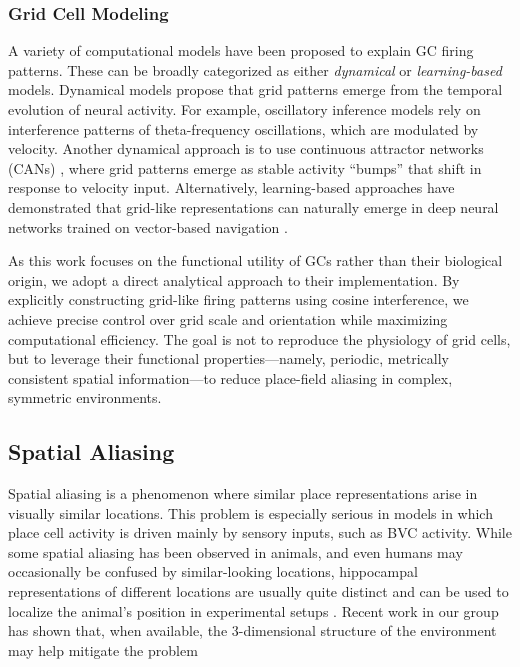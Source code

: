 \documentclass[conference]{IEEEtran}
\begin{document}
\subsubsection{Grid Cell Modeling}
A variety of computational models have been proposed to explain GC firing patterns. These can be broadly categorized as either \textit{dynamical} or \textit{learning-based} models. Dynamical models propose that grid patterns emerge from the temporal evolution of neural activity. For example, oscillatory inference models \cite{burgess2007oscillatory, hasselmo2007grid} rely on interference patterns of theta-frequency oscillations, which are modulated by velocity. Another dynamical approach is to use continuous attractor networks (CANs) \cite{burak2009accurate}, where grid patterns emerge as stable activity ``bumps'' that shift in response to velocity input. Alternatively, learning-based approaches have demonstrated that grid-like representations can naturally emerge in deep neural networks trained on vector-based navigation \cite{banino2018vector}. 

As this work focuses on the functional utility of GCs rather than their biological origin, we adopt a direct analytical approach to their implementation. By explicitly constructing grid-like firing patterns using cosine interference, we achieve precise control over grid scale and orientation while maximizing computational efficiency. The goal is not to reproduce the physiology of grid cells, but to leverage their functional properties—namely, periodic, metrically consistent spatial information—to reduce place-field aliasing in complex, symmetric environments. 

\subsection{Spatial Aliasing}
Spatial aliasing is a phenomenon where similar place representations arise in visually similar locations. This problem is especially serious in models in which place cell activity is driven mainly by sensory inputs, such as BVC activity. While some spatial aliasing has been observed in animals, and even humans may occasionally be confused by similar-looking locations, hippocampal representations of different locations are usually quite distinct and can be used to localize the animal's position in experimental setups \cite{davidson2009replay,carr:2011replay,dragoi2011preplay}. Recent work in our group has shown that, when available, the 3-dimensional structure of the environment may help mitigate the problem \cite{GerstenslagerDukenbaevMinai2025}
\end{document}
